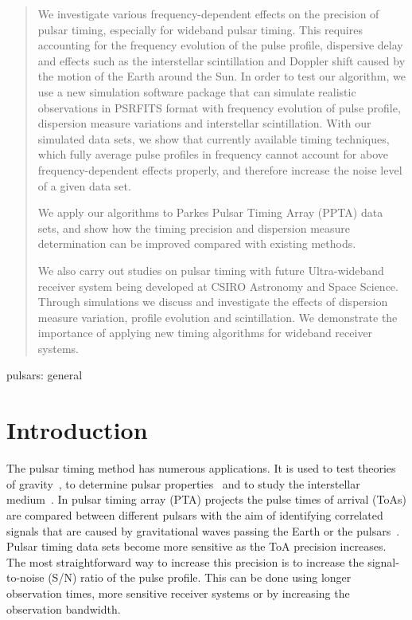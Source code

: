 \documentclass[useAMS,usenatbib]{mn2e}
\begin{document}
\maketitle

\begin{abstract}

We investigate various frequency-dependent effects on the precision of pulsar timing, especially 
for wideband pulsar timing. This requires accounting for the frequency evolution of the pulse 
profile, dispersive delay and effects such as the interstellar scintillation and Doppler shift 
caused by the motion of the Earth around the Sun. 
%
In order to test our algorithm, we use a new simulation software package that can simulate realistic 
observations in PSRFITS format with frequency evolution of pulse profile, dispersion measure variations 
and interstellar scintillation. 
%
With our simulated data sets, we show that currently available timing techniques, which fully average
pulse profiles in frequency cannot account for above frequency-dependent effects properly, and therefore 
increase the noise level of a given data set.
%

We apply our algorithms to Parkes Pulsar Timing Array (PPTA) data sets, and show how the timing 
precision and dispersion measure determination can be improved compared with existing methods.

We also carry out studies on pulsar timing with future Ultra-wideband receiver system being 
developed at CSIRO Astronomy and Space Science. Through simulations we discuss and investigate the 
effects of dispersion measure variation, profile evolution and scintillation. 
%
We demonstrate the importance of applying new timing algorithms for wideband receiver systems.

\end{abstract}



\begin{keywords}
%
pulsars: general
%
\end{keywords}


\section{Introduction}

The pulsar timing method has numerous applications. It is used to test theories of 
gravity~\citep[e.g.,][]{Kramer06}, to determine pulsar properties~\citep[e.g.,][]{Antoniadis} 
and to study the interstellar medium~\citep[e.g.,][]{Keith13}. In pulsar timing array (PTA) 
projects the pulse times of arrival (ToAs) are compared between different pulsars with the 
aim of identifying correlated signals that are caused by gravitational waves passing the 
Earth or the pulsars~\citep[e.g.,][]{Foster90}. Pulsar timing data sets become more sensitive 
as the ToA precision increases. The most straightforward way to increase this precision 
is to increase the signal-to-noise (S/N) ratio of the pulse profile. This can be done using 
longer observation times, more sensitive receiver systems or by increasing the observation 
bandwidth. 
\end{document}
